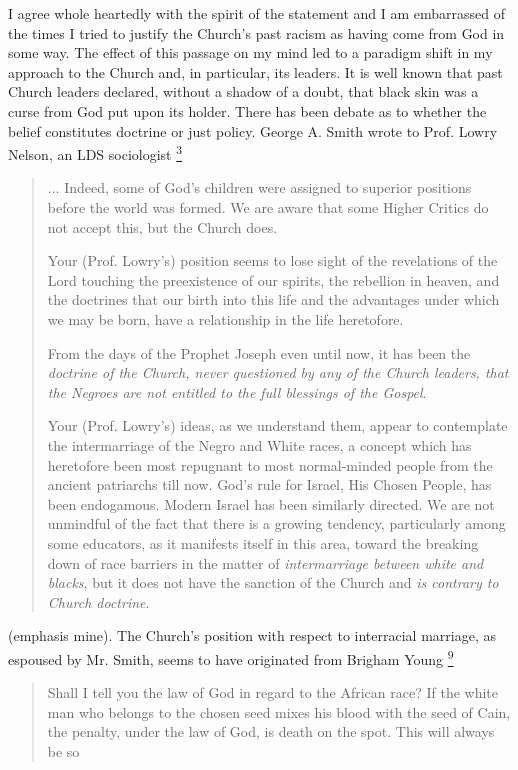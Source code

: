 \documentclass[a4paper]{article}
\providecommand*{\DUfootnotemark}[3]{%
  \raisebox{1em}{\hypertarget{#1}{}}%
  \hyperlink{#2}{\textsuperscript{#3}}%
}
\begin{document}
I agree whole heartedly with the spirit of the statement and I am embarrassed of the times I tried to justify the Church's past racism as having come from God in some way.  The effect of this passage on my mind led to a paradigm shift in my approach to the Church and, in particular, its leaders.  It is well known that past Church leaders declared, without a shadow of a doubt, that black skin was a curse from God put upon its holder.  There has been debate as to whether the belief constitutes doctrine or just policy.  George A. Smith wrote to Prof. Lowry Nelson, an LDS sociologist\DUfootnotemark{id3}{id14}{3}
%
\begin{quote}

... Indeed, some of God's children were assigned to superior positions before the world was formed.  We are aware that some Higher Critics do not accept this, but the Church does.

Your (Prof. Lowry's) position seems to lose sight of the revelations of the Lord touching the preexistence of our spirits, the rebellion in heaven, and the doctrines that our birth into this life and the advantages under which we may be born, have a relationship in the life heretofore.

From the days of the Prophet Joseph even until now, it has been the \emph{doctrine of the Church, never questioned by any of the Church leaders, that the Negroes are not entitled to the full blessings of the Gospel}.

Your (Prof. Lowry's) ideas, as we understand them, appear to contemplate the intermarriage of the Negro and White races, a concept which has heretofore been most repugnant to most normal-minded people from the ancient patriarchs till now. God's rule for Israel, His Chosen People, has been endogamous. Modern Israel has been similarly directed. We are not unmindful of the fact that there is a growing tendency, particularly among some educators, as it manifests itself in this area, toward the breaking down of race barriers in the matter of \emph{intermarriage between white and blacks}, but it does not have the sanction of the Church and \emph{is contrary to Church doctrine}.

\end{quote}

(emphasis mine).  The Church's position with respect to interracial marriage, as espoused by Mr. Smith, seems to have originated from Brigham Young\DUfootnotemark{id4}{id20}{9}
%
\begin{quote}

Shall I tell you the law of God in regard to the African race? If the white man who belongs to the chosen seed mixes his blood with the seed of Cain, the penalty, under the law of God, is death on the spot. This will always be so

\end{quote}
\end{document}
